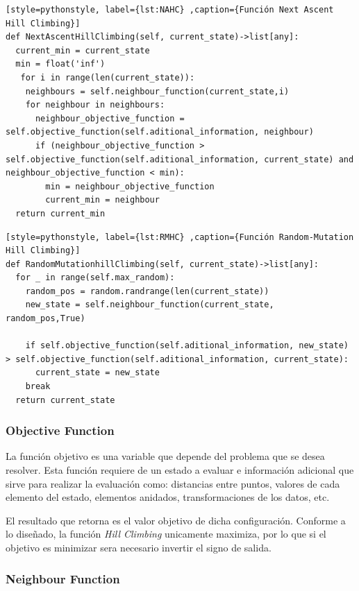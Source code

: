 \documentclass[12pt,twoside]{article}
\begin{document}
\begin{lstlisting}[style=pythonstyle, label={lst:NAHC} ,caption={Función Next Ascent Hill Climbing}]
def NextAscentHillClimbing(self, current_state)->list[any]:
  current_min = current_state
  min = float('inf')
   for i in range(len(current_state)):
    neighbours = self.neighbour_function(current_state,i)
    for neighbour in neighbours:
      neighbour_objective_function = self.objective_function(self.aditional_information, neighbour)
      if (neighbour_objective_function > self.objective_function(self.aditional_information, current_state) and neighbour_objective_function < min):
        min = neighbour_objective_function
        current_min = neighbour
  return current_min
\end{lstlisting}

\begin{lstlisting}[style=pythonstyle, label={lst:RMHC} ,caption={Función Random-Mutation Hill Climbing}]
def RandomMutationhillClimbing(self, current_state)->list[any]:       
  for _ in range(self.max_random):
    random_pos = random.randrange(len(current_state))
    new_state = self.neighbour_function(current_state, random_pos,True)
  
    if self.objective_function(self.aditional_information, new_state) > self.objective_function(self.aditional_information, current_state):
      current_state = new_state
    break
  return current_state
\end{lstlisting}

\subsubsection{Objective Function}

La función objetivo es una variable que depende del problema que se desea resolver. Esta función requiere de un estado a evaluar e información adicional que sirve para realizar la evaluación como: distancias entre puntos, valores de cada elemento del estado, elementos anidados, transformaciones de los datos, etc.

El resultado que retorna es el valor objetivo de dicha configuración. Conforme a lo diseñado, la función \textit{Hill Climbing} unicamente maximiza, por lo que si el objetivo es minimizar sera necesario invertir el signo de salida. 

\subsubsection{Neighbour Function}
\end{document}
